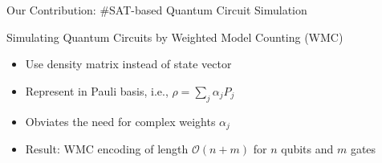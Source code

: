 \begin{refframe}{\alert{Our Contribution:} \#SAT-based Quantum Circuit Simulation}

\begin{block}{Simulating Quantum Circuits by Weighted Model Counting (WMC)\cite{mei2024simulating}}
\begin{itemize}
\item<+-> Use density matrix instead of state vector
\item<6-> Represent in Pauli basis, i.e., $\rho = \sum_j  \alpha_j P_j$  
\item<7-> \alert{Obviates the need for complex weights $\alpha_j$}
\item<8-> \alert{Result: WMC encoding of length $\mathcal O(n +m)$ for $n$ qubits and $m$ gates}
\end{itemize}
\end{block}



\end{refframe}




